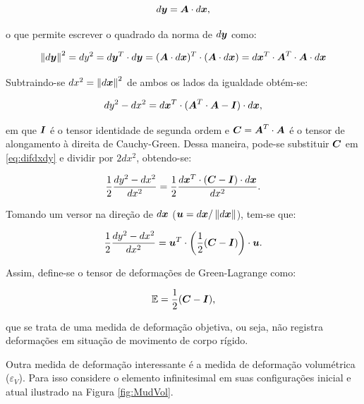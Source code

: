 \begin{equation}
    d\boldsymbol{y}=\boldsymbol{A}\cdot d\boldsymbol{x}\text{,}\label{eq:dyAdx}
\end{equation}

\noindent o que permite escrever o quadrado da norma de $d\boldsymbol{y}$ como:

\[
    \left\lVert{d\boldsymbol{y}}\right\lVert^2=dy^2=d\boldsymbol{y}^T\cdot d\boldsymbol{y}=(\boldsymbol{A}\cdot d\boldsymbol{x})^T\cdot(\boldsymbol{A}\cdot d\boldsymbol{x})=d\boldsymbol{x}^T\cdot\boldsymbol{A}^T\cdot\boldsymbol{A}\cdot d\boldsymbol{x}
\]

Subtraindo-se $dx^2=\left\lVert{d\boldsymbol{x}}\right\lVert^2$ de ambos os lados da igualdade obtém-se:

\begin{equation}
    dy^2-dx^2=d\boldsymbol{x}^T\cdot(\boldsymbol{A}^T\cdot\boldsymbol{A}-\boldsymbol{I})\cdot d\boldsymbol{x}\text{,}
    \label{eq:difdxdy}
\end{equation}

\noindent em que $\boldsymbol{I}$ é o tensor identidade de segunda ordem e $\boldsymbol{C}=\boldsymbol{A}^T\cdot\boldsymbol{A}$ é o tensor de alongamento à direita de Cauchy-Green. Dessa maneira, pode-se substituir $\boldsymbol{C}$ em \eqref{eq:difdxdy} e dividir por $2dx^2$, obtendo-se:

\[
    \frac{1}{2}\frac{dy^2-dx^2}{dx^2}=\frac{1}{2}\frac{d\boldsymbol{x}^T\cdot(\boldsymbol{C}-\boldsymbol{I})\cdot d\boldsymbol{x}}{dx^2}\text{.}
\]

\noindent Tomando um versor na direção de $d\boldsymbol{x}$ ($\boldsymbol{u}=d\boldsymbol{x}/\left\lVert{d\boldsymbol{x}}\right\lVert$), tem-se que:

\begin{equation}
    \frac{1}{2}\frac{dy^2-dx^2}{dx^2}=\boldsymbol{u}^T\cdot\left(\frac{1}{2}(\boldsymbol{C}-\boldsymbol{I})\right)\cdot\boldsymbol{u}\text{.}
\end{equation}

Assim, define-se o tensor de deformações de Green-Lagrange como:

\begin{equation}
    \mathbb{E}=\frac{1}{2}(\boldsymbol{C}-\boldsymbol{I})\text{,}
    \label{eq:CSD-DefGreenLagr}
\end{equation}

\noindent que se trata de uma medida de deformação objetiva, ou seja, não registra deformações em situação de movimento de corpo rígido.

Outra medida de deformação interessante é a medida de deformação volumétrica ($\varepsilon_V$). Para isso considere o elemento infinitesimal em suas configurações inicial e atual ilustrado na Figura \ref{fig:MudVol}.

